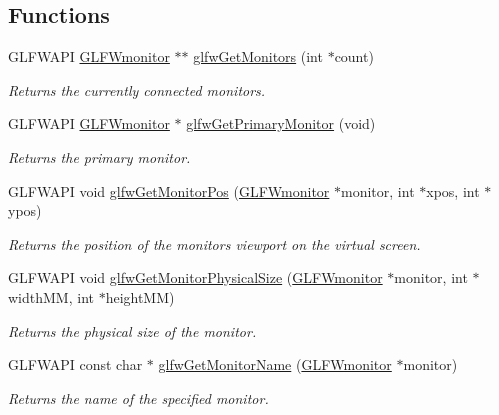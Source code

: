 \subsection*{Functions}
\begin{DoxyCompactItemize}
\item 
G\+L\+F\+W\+A\+PI \hyperlink{group__monitor_ga8d9efd1cde9426692c73fe40437d0ae3}{G\+L\+F\+Wmonitor} $\ast$$\ast$ \hyperlink{group__monitor_gab4d483284c57e28837bc2cd9639e9665}{glfw\+Get\+Monitors} (int $\ast$count)
\begin{DoxyCompactList}\small\item\em Returns the currently connected monitors. \end{DoxyCompactList}\item 
G\+L\+F\+W\+A\+PI \hyperlink{group__monitor_ga8d9efd1cde9426692c73fe40437d0ae3}{G\+L\+F\+Wmonitor} $\ast$ \hyperlink{group__monitor_ga59ea49f377fe701dd76764183e64d9f4}{glfw\+Get\+Primary\+Monitor} (void)
\begin{DoxyCompactList}\small\item\em Returns the primary monitor. \end{DoxyCompactList}\item 
G\+L\+F\+W\+A\+PI void \hyperlink{group__monitor_ga45b5481a614ad7beb2aade9746d07563}{glfw\+Get\+Monitor\+Pos} (\hyperlink{group__monitor_ga8d9efd1cde9426692c73fe40437d0ae3}{G\+L\+F\+Wmonitor} $\ast$monitor, int $\ast$xpos, int $\ast$ypos)
\begin{DoxyCompactList}\small\item\em Returns the position of the monitor\textquotesingle{}s viewport on the virtual screen. \end{DoxyCompactList}\item 
G\+L\+F\+W\+A\+PI void \hyperlink{group__monitor_gad0e93a9e42b32394369cabbbdc1ab702}{glfw\+Get\+Monitor\+Physical\+Size} (\hyperlink{group__monitor_ga8d9efd1cde9426692c73fe40437d0ae3}{G\+L\+F\+Wmonitor} $\ast$monitor, int $\ast$width\+MM, int $\ast$height\+MM)
\begin{DoxyCompactList}\small\item\em Returns the physical size of the monitor. \end{DoxyCompactList}\item 
G\+L\+F\+W\+A\+PI const char $\ast$ \hyperlink{group__monitor_ga22f62011bae33ea8d2974eff5d14f9b8}{glfw\+Get\+Monitor\+Name} (\hyperlink{group__monitor_ga8d9efd1cde9426692c73fe40437d0ae3}{G\+L\+F\+Wmonitor} $\ast$monitor)
\begin{DoxyCompactList}\small\item\em Returns the name of the specified monitor. \end{DoxyCompactList}\item 
$$
\end{DoxyCompactItemize}
